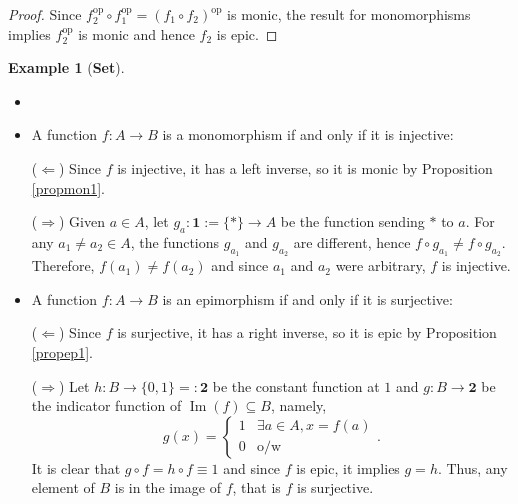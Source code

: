 \documentclass{article}
\theoremstyle{definition}
\newtheorem{exmp}[thm]{Example}
\theoremstyle{remark}
\DeclareMathOperator{\im}{Im}
\newcommand{\op}[1]{#1^{\text{op}}}
\begin{document}
\begin{proof}
	Since $\op{f_2} \circ \op{f_1} = \op{(f_1 \circ f_2)}$ is monic, the result for monomorphisms implies $\op{f_2}$ is monic and hence $f_2$ is epic.
\end{proof}
\begin{exmp}[\textbf{Set}]
	\begin{itemize}
		\item[]
		\item A function $f:A\rightarrow B$ is a monomorphism if and only if it is injective:
		
		($\Leftarrow$) Since $f$ is injective, it has a left inverse, so it is monic by Proposition \ref{propmon1}.
		
		($\Rightarrow$) Given $a \in A$, let $g_a: \mathbf{1}:=\{\ast\} \rightarrow A$ be the function sending $\ast$ to $a$. For any $a_1 \neq a_2 \in A$, the functions $g_{a_1}$ and $g_{a_2}$ are different, hence $f \circ g_{a_1} \neq f \circ g_{a_2}$. Therefore, $f(a_1) \neq f(a_2)$ and since $a_1$ and $a_2$ were arbitrary, $f$ is injective.
		
		\item A function $f:A\rightarrow B$ is an epimorphism if and only if it is surjective:
		
		($\Leftarrow$) Since $f$ is surjective, it has a right inverse, so it is epic by Proposition \ref{propep1}.
		
		($\Rightarrow$) Let $h: B \rightarrow \{0,1\}=:\mathbf{2}$ be the constant function at $1$ and $g:B \rightarrow \mathbf{2}$ be the indicator function of $\im(f) \subseteq B$, namely, \[g(x) = \begin{cases}1&\exists a \in A, x = f(a)\\0&\text{o/w}\end{cases}.\]
		It is clear that $g \circ f = h\circ f \equiv 1$ and since $f$ is epic, it implies $g = h$. Thus, any element of $B$ is in the image of $f$, that is $f$ is surjective.
	\end{itemize}
\end{exmp}
\end{document}
